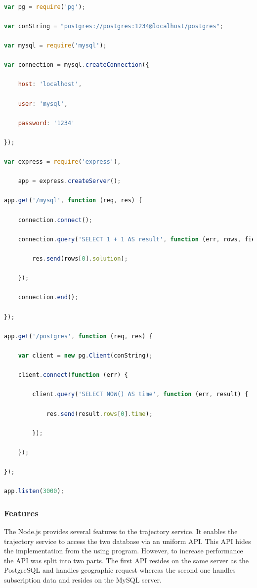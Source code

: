 \documentclass[master,english]{hgbthesis}
\begin{document}
\begin{lstlisting}[style=htmlcssjs,language=JavaScript,caption={Example for a Node.js app which is using the express framework and the PostgreSQL and MySQL module},label={lst:nodeexpress}]

var pg = require('pg');

var conString = "postgres://postgres:1234@localhost/postgres";

var mysql = require('mysql');

var connection = mysql.createConnection({

    host: 'localhost',

    user: 'mysql',

    password: '1234'

});

var express = require('express'),

    app = express.createServer();

app.get('/mysql', function (req, res) {

    connection.connect();

    connection.query('SELECT 1 + 1 AS result', function (err, rows, fields) {

        res.send(rows[0].solution);

    });

    connection.end();

});

app.get('/postgres', function (req, res) {

    var client = new pg.Client(conString);

    client.connect(function (err) {

        client.query('SELECT NOW() AS time', function (err, result) {

            res.send(result.rows[0].time);

        });

    });

});

app.listen(3000);

\end{lstlisting} 

\subsubsection{Features}

The Node.js provides several features  to the trajectory service. It enables the trajectory service to access the two database via an uniform API. This API hides the implementation from the using program. However, to increase performance the API was split into two parts. The first API resides on the same server as the PostgreSQL and handles geographic request whereas the second one handles subscription data and resides on the MySQL server.
\end{document}

